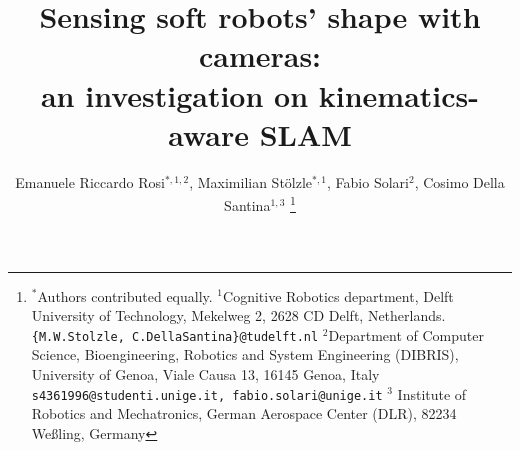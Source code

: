 \documentclass[a4paper, 10pt, conference]{ieeeconf}      %
\theoremstyle{plain}
\begin{document}


%
\title{\LARGE \bf
Sensing soft robots' shape with cameras: \\ an investigation on kinematics-aware SLAM
}


\author{Emanuele Riccardo Rosi$^{*, 1, 2}$, Maximilian Stölzle$^{*, 1}$, Fabio Solari$^{2}$, Cosimo Della Santina$^{1,3}$ %
\thanks{%
$^*$Authors contributed equally.
$^{1}$Cognitive Robotics department, Delft University of Technology, Mekelweg 2, 2628 CD Delft, Netherlands. {\tt\scriptsize \{M.W.Stolzle, C.DellaSantina\}@tudelft.nl} %
$^{2}$Department of Computer Science, Bioengineering, Robotics and System Engineering (DIBRIS), University of Genoa, Viale Causa 13, 16145 Genoa, Italy {\tt\scriptsize s4361996@studenti.unige.it, fabio.solari@unige.it} %
$^{3}$ Institute of Robotics and Mechatronics, German Aerospace Center (DLR), 82234 Weßling, Germany
}%
}

\maketitle
\end{document}
